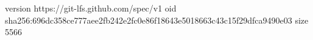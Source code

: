 version https://git-lfs.github.com/spec/v1
oid sha256:696dc358ce777aee2fb242e2fc0e86f18643e5018663c43c15f29dfca9490e03
size 5566
